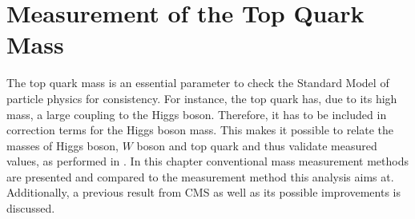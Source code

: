 \chapter{Measurement of the Top Quark Mass}
\label{ch:Measure}
	The top quark mass is an essential parameter to check the Standard Model of particle physics for consistency. For instance, the top quark has, due to its high mass, a large coupling to the Higgs boson. Therefore, it has to be included in correction terms for the Higgs boson mass. This makes it possible to relate the masses of Higgs boson, $W$ boson and top quark and thus validate measured values, as performed in \cite{ewfit}. In this chapter conventional mass measurement methods are presented and compared to the measurement method this analysis aims at. Additionally, a previous result from CMS as well as its possible improvements is discussed. 
	
